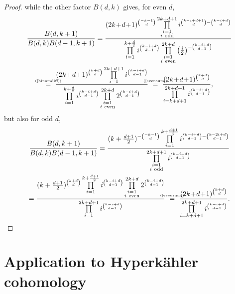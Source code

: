 \begin{proof}
while the other factor $B(d,k)$ gives, for even $d$,
\begin{gather*}
\frac{B(d,k+1)}{B(d,k)B(d-1,k+1)} = \frac{ (2k\!+\!d\!+\!1)^{\binom{-k-1}{d}} \prod\limits_{\substack{i=1 \\ i\ \text{odd} }}^{2k+d+1}i^{\binom{k-i+d+1}{d}-\binom{k-i+d}{d}}  }{\prod\limits_{i=1}^{k+\frac{d}{2}} i^{\binom{k-i+d}{d-1}} \prod\limits_{\substack{i=1 \\ i\ \text{even} }}^{2k+d} \left(\frac{i}{2}\right)^{- \binom{k-i+d}{d-1}} } \\
\myeq{(\ref{binomdiff})}\ \frac{ (2k\!+\!d\!+\!1)^{\binom{k+d}{d}}  \prod\limits_{i=1}^{2k+d+1}i^{\binom{k-i+d}{d-1}}  }{ \prod\limits_{i=1}^{k+\frac{d}{2}} i^{\binom{k-i+d}{d-1}} \prod\limits_{\substack{i=1 \\ i\ \text{even} }}^{2k+d} 2^{ \binom{k-i+d}{d-1}} } 
\ \myeq{(\ref{evensum})} \ \frac{ (2k\!+\!d\!+\!1)^{\binom{k+d}{d}} }{ \prod\limits_{i=k+d+1}^{2k+d+1}i^{ \binom{k-i+d}{d-1}} },
\end{gather*}
but also for odd $d$,
\begin{gather*}
\frac{B(d,k+1)}{B(d,k)B(d-1,k+1)} = \frac{ (k+\tfrac{d+1}{2})^{-\binom{-k-1}{d}} \prod\limits_{i=1}^{k+\frac{d+1}{2}} i^{\binom{k-i+d}{d-1}-\binom{k-2i+d}{d-1}}  }{ \prod\limits_{\substack{i=1 \\ i\ \text{odd} }}^{2k+d+1}i^{\binom{k-i+d}{d-1}} } \\
= \frac{ (k+\tfrac{d+1}{2})^{\binom{k+d}{d}} \prod\limits_{i=1}^{k+\frac{d+1}{2}} i^{\binom{k-i+d}{d-1}}  \prod\limits_{\substack{i=1 \\ i\ \text{even} }}^{2k+d} 2^{ \binom{k-i+d}{d-1}}}{ \prod\limits_{i=1}^{2k+d+1}i^{\binom{k-i+d}{d-1}}} 
\ \myeq{(\ref{evensum})} \ \frac{ (2k\!+\!d\!+\!1)^{\binom{k+d}{d}} }{ \prod\limits_{i=k+d+1}^{2k+d+1}i^{ \binom{k-i+d}{d-1}} }. \qedhere
\end{gather*}\nobreak
\end{proof}


\chapter{Application to Hyperk\"ahler cohomology}

